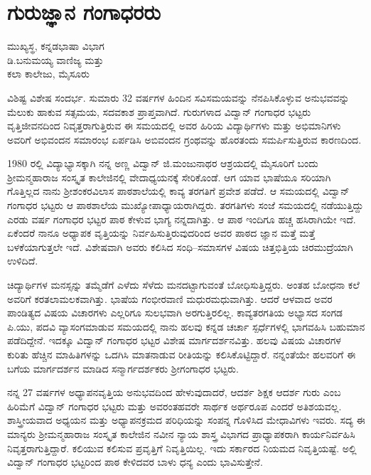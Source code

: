 \chapter{ಗುರುಜ್ಞಾನ ಗಂಗಾಧರರು}

\begin{center}
\smallskip
 ಮುಖ್ಯಸ್ಥ, ಕನ್ನಡಭಾಷಾ ವಿಭಾಗ\\
ಡಿ.ಬನುಮಯ್ಯ ವಾಣಿಜ್ಯ ಮತ್ತು \\
ಕಲಾ ಕಾಲೇಜು, ಮೈಸೂರು
\addrule
\end{center}

ವಿಶಿಷ್ಟ ವಿಶೇಷ ಸಂದರ್ಭ. ಸುಮಾರು 32 ವರ್ಷಗಳ ಹಿಂದಿನ ಸವಿಸಮಯವನ್ನು ನೆನಪಿಸಿಕೊಳ್ಳುವ ಅನುಭವವನ್ನು ಮೆಲುಕು ಹಾಕುವ ಸತ್ಸಮಯ, ಸದವಕಾಶ ಪ್ರಾಪ್ತವಾಗಿದೆ. ಗುರುಗಳಾದ ವಿದ್ವಾನ್ ಗಂಗಾಧರ ಭಟ್ಟರು ವೃತ್ತಿಜೀವನದಿಂದ ನಿವೃತ್ತರಾಗುತ್ತಿರುವ ಈ ಸಮಯದಲ್ಲಿ ಅವರ ಹಿರಿಯ ವಿದ್ಯಾರ್ಥಿಗಳು ಮತ್ತು ಅಭಿಮಾನಿಗಳು ಅವರಿಗೆ ಅಭಿವಂದನ ಸಮಾರಂಭ ಏರ್ಪಡಿಸಿ ಅಬಿವಂದನ ಗ್ರಂಥವನ್ನು ಹೊರತಂದು ಸಮರ್ಪಿಸುತ್ತಿರುವ ಕಾರಣದಿಂದ.

1980 ರಲ್ಲಿ ವಿದ್ಯಾಭ್ಯಾಸಕ್ಕಾಗಿ ನನ್ನ ಅಣ್ಣ ವಿದ್ವಾನ್ ಜಿ.ಮಂಜುನಾಥರ ಆಶ್ರಯದಲ್ಲಿ ಮೈಸೂರಿಗೆ ಬಂದು ಶ್ರೀಮನ್ಮಹಾರಾಜ ಸಂಸ್ಕೃತ ಕಾಲೇಜಿನಲ್ಲಿ ವೇದಾಧ್ಯಯನಕ್ಕೆ ಸೇರಿಕೊಂಡೆ. ಆಗ ಯಾವ ಭಾಷೆಯೂ ಸರಿಯಾಗಿ ಗೊತ್ತಿಲ್ಲದ ನಾನು ಶ್ರೀಶಂಕರವಿಲಾಸ ಪಾಠಶಾಲೆಯಲ್ಲಿ ಕಾವ್ಯ ತರಗತಿಗೆ ಪ್ರವೇಶ ಪಡೆದೆ. ಆ ಸಮಯದಲ್ಲಿ ವಿದ್ವಾನ್ ಗಂಗಾಧರ ಭಟ್ಟರು ಆ ಪಾಠಶಾಲೆಯ ಮುಖ್ಯೋಪಾಧ್ಯಾಯರಾಗಿದ್ದರು. ತರಗತಿಗಳು ಸಂಜೆ ಸಮಯದಲ್ಲಿ ನಡೆಯುತ್ತಿದ್ದು ಎರಡು ವರ್ಷ ಗಂಗಾಧರ ಭಟ್ಟರ ಪಾಠ ಕೇಳುವ ಭಾಗ್ಯ ನನ್ನದಾಗಿತ್ತು. ಆ ಪಾಠ ಇಂದಿಗೂ ಹಚ್ಚ ಹಸಿರಾಗಿಯೇ ಇದೆ. ಏಕೆಂದರೆ ನಾನೂ ಅಧ್ಯಾಪಕ ವೃತ್ತಿಯನ್ನು ನಿರ್ವಹಿಸುತ್ತಿರುವುದರಿಂದ ಅವರ ಪಾಠದ ಜ್ಞಾನ ಮತ್ತೆ ಮತ್ತೆ ಬಳಕೆಯಾಗುತ್ತಲೇ ಇದೆ. ವಿಶೇಷವಾಗಿ ಅವರು ಕಲಿಸಿದ ಸಂಧಿ–ಸಮಾಸಗಳ ವಿಷಯ ಚಿತ್ತಭಿತ್ತಿಯ ಚಿರಮುದ್ರೆಯಾಗಿ ಉಳಿದಿದೆ. 

ಚಿದ್ಯಾರ್ಥಿಗಳ ಮನಸ್ಸನ್ನು ತಮ್ಮೆಡೆಗೆ ಎಳೆದು ಸೆಳೆದು ಮನದಟ್ಟಾಗುವಂತೆ ಬೋಧಿಸುತ್ತಿದ್ದರು. ಅಂತಹ ಬೋಧನಾ ಕಲೆ ಅವರಿಗೆ ಕರತಲಾಮಲಕವಾಗಿತ್ತು. ಭಾಷೆಯ ಗಂಭೀರವಾಣಿ ಮಧುರಮಧುವಾಗಿತ್ತು. ಆದರೆ ಆಳವಾದ ಅವರ ಪಾಂಡಿತ್ಯದ ವಿಷಯ ವಿಚಾರಗಳು ಎಲ್ಲರಿಗೂ ಸುಲಭವಾಗಿ ಅರಗುತ್ತಿರಲಿಲ್ಲ. ಕಾವ್ಯತರಗತಿಯ ಅಭ್ಯಾಸದ ಸಂಗಡ ಪಿ.ಯು, ಪದವಿ ವ್ಯಾಸಂಗಮಾಡುವ ಸಮಯದಲ್ಲಿ ನಾನು ಹಲವು ಕನ್ನಡ ಚರ್ಚಾ ಸ್ಪರ್ಧೆಗಳಲ್ಲಿ ಭಾಗವಹಿಸಿ ಬಹುಮಾನ ಪಡೆದಿದ್ದೇನೆ. ಇದಕ್ಕೂ ವಿದ್ವಾನ್ ಗಂಗಾಧರ ಭಟ್ಟರ ವಿಶೇಷ ಮಾರ್ಗದರ್ಶನವಿತ್ತು. ಹಲವು ವಿಷಯ ವಿಚಾರಗಳ ಕುರಿತು ಹೆಚ್ಚಿನ ಮಾಹಿತಿಗಳನ್ನು ಒದಗಿಸಿ ಮಾತನಾಡುವ ರೀತಿಯನ್ನು ಕಲಿಸಿಕೊಟ್ಟಿದ್ದಾರೆ. ನನ್ನಂತೆಯೇ ಹಲವರಿಗೆ ಈ ಬಗೆಯ ಮಾರ್ಗದರ್ಶನ ಮಾಡಿದ ಸನ್ಮಾರ್ಗದರ್ಶಕರು ಶ್ರೀಗಂಗಾಧರ ಭಟ್ಟರು. 

ನನ್ನ 27 ವರ್ಷಗಳ ಅಧ್ಯಾಪನವೃತ್ತಿಯ ಅನುಭವದಿಂದ ಹೇಳುವುದಾದರೆ, ಆದರ್ಶ ಶಿಕ್ಷಕ ಆದರ್ಶ ಗುರು ಎಂಬ ಹಿರಿಮೆಗೆ ವಿದ್ವಾನ್ ಗಂಗಾಧರ ಭಟ್ಟರು ಮತ್ತು ಅವರಂತಹವರೇ ಸಾರ್ಥಕ ಅರ್ಥರೂಪ ಎಂದರೆ ಅತಿಶಯವಲ್ಲ. ಶಾಸ್ತ್ರೀಯವಾದ ಅಧ್ಯಯನ ಮತ್ತು ಅಧ್ಯಾಪನಕ್ರಮದ ಪರಿಧಿಯನ್ನು ಸಂಪನ್ನ ಗೊಳಿಸಿದ ಮೇಧಾವಿಗಳು ಇವರು. ಸದ್ಯ ಈ ಮಾನ್ಯರು ಶ್ರೀಮನ್ಮಹಾರಾಜ ಸಂಸ್ಕೃತ ಕಾಲೇಜಿನ ನವೀನ ನ್ಯಾಯ ಶಾಸ್ತ್ರ ವಿಭಾಗದ ಪ್ರಾಧ್ಯಾಪಕರಾಗಿ ಕಾರ್ಯನಿರ್ವಹಿಸಿ ನಿವೃತ್ತರಾಗುತ್ತಿದ್ದಾರೆ. ಕಲಿಯುವ ಕಲಿಸುವ ಪ್ರವೃತ್ತಿಗೆ ನಿವೃತ್ತಿಯಿಲ್ಲ. ಇದು ಸರ್ಕಾರದ ನಿಯಮದ ನಿವೃತ್ತಿಯಷ್ಟೆ. ಅಲ್ಲಿ ವಿದ್ವಾನ್ ಗಂಗಾಧರ ಭಟ್ಟರಿಂದ ಪಾಠ ಕೇಳಿದವರ ಬಾಳು ಧನ್ಯ ಎಂದು ಭಾವಿಸುತ್ತೇನೆ.


